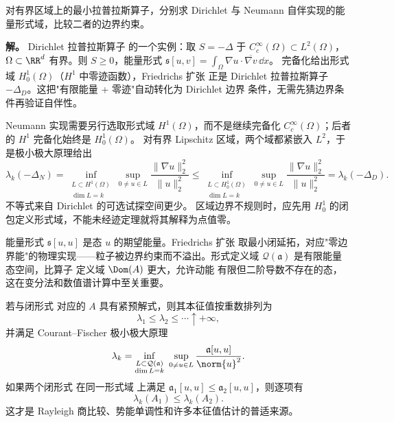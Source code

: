\begin{example}
对有界区域上的最小拉普拉斯算子，分别求 Dirichlet 与 Neumann 自伴实现的能量形式域，比较二者的边界约束。

\textbf{解。} Dirichlet 拉普拉斯算子 的一个实例：取 $S=-\Delta$ 于 $C_c^\infty(\Omega)\subset L^2(\Omega)$，
$\Omega\subset\RR^d$ 有界。则 $S\ge0$，能量形式
$\mathfrak s[u,v]=\int_\Omega\nabla u\cdot\overline{\nabla v}\,\dd x$。
完备化给出形式域 $H^1_0(\Omega)$（$H^1$ 中零迹函数），Friedrichs 扩张
正是 Dirichlet 拉普拉斯算子 $-\Delta_D$。这把"有限能量 + 零迹"自动转化为 Dirichlet 边界
条件，无需先猜边界条件再验证自伴性。

Neumann 实现需要另行选取形式域 $H^1(\Omega)$，而不是继续完备化
$C_c^\infty(\Omega)$；后者的 $H^1$ 完备化始终是 $H_0^1(\Omega)$。
对有界 Lipschitz 区域，两个域都紧嵌入 $L^2$，于是极小极大原理给出
\[
\lambda_k(-\Delta_N)
=\inf_{\substack{L\subset H^1(\Omega)\\\dim L=k}}
\sup_{0\ne u\in L}\frac{\|\nabla u\|_2^2}{\|u\|_2^2}
\le\inf_{\substack{L\subset H_0^1(\Omega)\\\dim L=k}}
\sup_{0\ne u\in L}\frac{\|\nabla u\|_2^2}{\|u\|_2^2}
=\lambda_k(-\Delta_D).
\]
不等式来自 Dirichlet 的可选试探空间更少。
区域边界不规则时，应先用 $H_0^1$ 的闭包定义形式域，不能未经迹定理就将其解释为点值零。
\end{example}

能量形式 $\mathfrak s[u,u]$ 是态 $u$ 的期望能量。Friedrichs 扩张
取最小闭延拓，对应"零边界能"的物理实现——粒子被边界约束而不溢出。形式定义域
$\mathcal Q(\mathfrak a)$ 是有限能量态空间，比算子 定义域 $\Dom(A)$ 更大，允许动能
有限但二阶导数不存在的态，这在变分法和数值谱计算中至关重要。

\begin{theorem}[极小极大原理与能级单调性]
若与闭形式 对应的 $A$ 具有紧预解式，则其本征值按重数排列为
\[
 \lambda_1\le\lambda_2\le\cdots\uparrow+\infty,
\]
并满足 Courant--Fischer 极小极大原理
\begin{equation}\label{eq:math-sl-minmax-general}
 \lambda_k
 =\inf_{\substack{L\subset\mathcal Q(\mathfrak a)\\\dim L=k}}
 \ \sup_{0\ne u\in L}
 \frac{\mathfrak a[u,u]}{\norm{u}^2}.
\end{equation}
如果两个闭形式 在同一形式域 上满足
$\mathfrak a_1[u,u]\le\mathfrak a_2[u,u]$，则逐项有
\begin{equation}\label{eq:math-sl-form-monotonicity}
 \lambda_k(A_1)\le\lambda_k(A_2).
\end{equation}
这才是 Rayleigh 商比较、势能单调性和许多本征值估计的普适来源。
\end{theorem}

